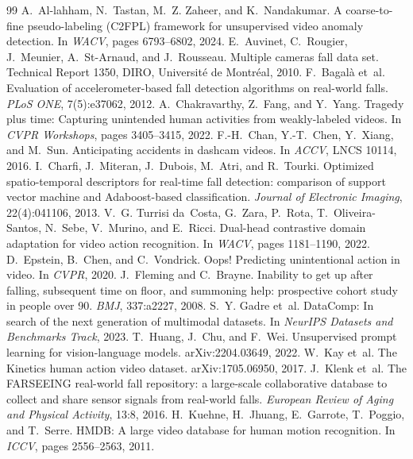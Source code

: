 \documentclass[10pt,twocolumn,letterpaper]{article}
\begin{document}
\small
\begin{thebibliography}{99}
 A.~Al-lahham, N.~Tastan, M.~Z. Zaheer, and K.~Nandakumar. A coarse-to-fine pseudo-labeling (C2FPL) framework for unsupervised video anomaly detection. In \emph{WACV}, pages 6793--6802, 2024.
 E.~Auvinet, C.~Rougier, J.~Meunier, A.~St-Arnaud, and J.~Rousseau. Multiple cameras fall data set. Technical Report 1350, DIRO, Universit\'e de Montr\'eal, 2010.
 F.~Bagal\`a et~al. Evaluation of accelerometer-based fall detection algorithms on real-world falls. \emph{PLoS ONE}, 7(5):e37062, 2012.
 A.~Chakravarthy, Z.~Fang, and Y.~Yang. Tragedy plus time: Capturing unintended human activities from weakly-labeled videos. In \emph{CVPR Workshops}, pages 3405--3415, 2022.
 F.-H.~Chan, Y.-T.~Chen, Y.~Xiang, and M.~Sun. Anticipating accidents in dashcam videos. In \emph{ACCV}, LNCS 10114, 2016.
 I.~Charfi, J.~Miteran, J.~Dubois, M.~Atri, and R.~Tourki. Optimized spatio-temporal descriptors for real-time fall detection: comparison of support vector machine and Adaboost-based classification. \emph{Journal of Electronic Imaging}, 22(4):041106, 2013.
 V.~G. Turrisi da~Costa, G.~Zara, P.~Rota, T.~Oliveira-Santos, N.~Sebe, V.~Murino, and E.~Ricci. Dual-head contrastive domain adaptation for video action recognition. In \emph{WACV}, pages 1181--1190, 2022.
 D.~Epstein, B.~Chen, and C.~Vondrick. Oops! Predicting unintentional action in video. In \emph{CVPR}, 2020.
 J.~Fleming and C.~Brayne. Inability to get up after falling, subsequent time on floor, and summoning help: prospective cohort study in people over 90. \emph{BMJ}, 337:a2227, 2008.
 S.~Y. Gadre et~al. DataComp: In search of the next generation of multimodal datasets. In \emph{NeurIPS Datasets and Benchmarks Track}, 2023.
 T.~Huang, J.~Chu, and F.~Wei. Unsupervised prompt learning for vision-language models. arXiv:2204.03649, 2022.
 W.~Kay et~al. The Kinetics human action video dataset. arXiv:1705.06950, 2017.
 J.~Klenk et~al. The FARSEEING real-world fall repository: a large-scale collaborative database to collect and share sensor signals from real-world falls. \emph{European Review of Aging and Physical Activity}, 13:8, 2016.
 H.~Kuehne, H.~Jhuang, E.~Garrote, T.~Poggio, and T.~Serre. HMDB: A large video database for human motion recognition. In \emph{ICCV}, pages 2556--2563, 2011.

\end{thebibliography}
\end{document}

